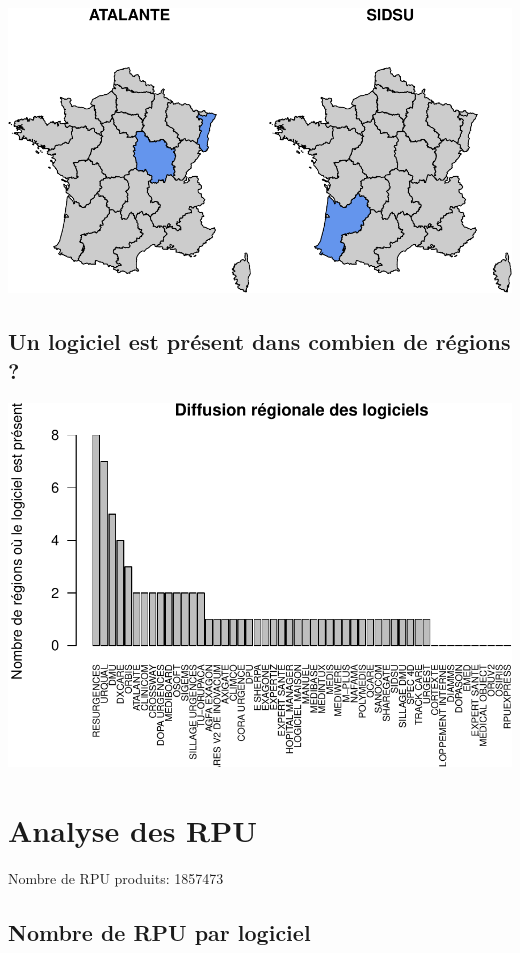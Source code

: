 \documentclass[]{article}
\begin{document}
\includegraphics{septembre2015_files/figure-latex/unnamed-chunk-7-4.pdf}

\subsection{Un logiciel est présent dans combien de régions
?}\label{un-logiciel-est-present-dans-combien-de-regions}

\includegraphics{septembre2015_files/figure-latex/unnamed-chunk-8-1.pdf}

\section{Analyse des RPU}\label{analyse-des-rpu}

Nombre de RPU produits: 1857473

\subsection{Nombre de RPU par
logiciel}\label{nombre-de-rpu-par-logiciel}
\end{document}
